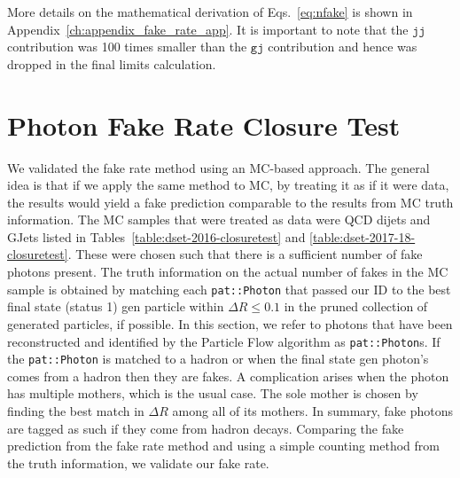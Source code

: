 

More details on the mathematical derivation of Eqs.~\ref{eq:nfake} is shown in Appendix~\ref{ch:appendix_fake_rate_app}. It is important to note that the $\texttt{jj}$ contribution was 100 times smaller than the $\texttt{gj}$ contribution and hence was dropped in the final limits calculation. 

\section{Photon Fake Rate Closure Test}\label{sec:closure_test}
We validated the fake rate method using an MC-based approach. The general idea is that if we apply the same method to MC, by treating it as if it were data, the results would yield a fake prediction comparable to the results from MC truth information. The MC samples that were treated as data were QCD dijets and GJets listed in Tables~\ref{table:dset-2016-closuretest} and \ref{table:dset-2017-18-closuretest}. These were chosen such that there is a sufficient number of fake photons present. The truth information on the actual number of fakes in the MC sample is obtained by matching each \texttt{pat::Photon} that passed our ID to the best final state (status 1) gen particle within $\Delta R \leq 0.1$ in the pruned collection of generated particles, if possible. In this section, we refer to photons that have been reconstructed and identified by the Particle Flow algorithm as \texttt{pat::Photon}s. If the \texttt{pat::Photon} is matched to a hadron or when the final state gen photon's comes from a hadron then they are fakes. A complication arises when the photon has multiple mothers, which is the usual case. The sole mother is chosen by finding the best match in $\Delta R$ among all of its mothers. In summary, fake photons are tagged as such if they come from hadron decays. Comparing the fake prediction from the fake rate method and using a simple counting method from the truth information, we validate our fake rate.


